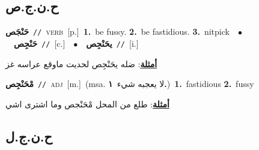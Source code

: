 \documentclass[10pt,a4paper,twoside]{article} %
\begin{document}
\begin{multicols}{2}
\vspace{-3mm}
\subsection*{\color{blue}\foreignlanguage{arabic}{ح.ن.ج.ص}\color{blue}{}} 

{\setlength\topsep{0pt}\textbf{\foreignlanguage{arabic}{حَنْجَص}}\ {\color{gray}\texttt{//}\color{black}}\ \textsc{verb}\ [p.]\ \textbf{1.}~be fussy.  \textbf{2.}~be fastidious.  \textbf{3.}~nitpick\ \ $\bullet$\ \ \setlength\topsep{0pt}\textbf{\foreignlanguage{arabic}{حَنْجِص}}\ {\color{gray}\texttt{//}\color{black}}\ [c.]\ \ $\bullet$\ \ \setlength\topsep{0pt}\textbf{\foreignlanguage{arabic}{يحَنْجِص}}\ {\color{gray}\texttt{//}\color{black}}\ [i.]\  \begin{flushright}\color{gray}\foreignlanguage{arabic}{\textbf{\underline{\foreignlanguage{arabic}{أمثلة}}}: ضله يحَنْجِص لحديت ماوقع عراسه غز}\end{flushright}\color{black}} \vspace{2mm}

{\setlength\topsep{0pt}\textbf{\foreignlanguage{arabic}{مْحَنْجِص}}\ {\color{gray}\texttt{//}\color{black}}\ \textsc{adj}\ [m.]\ \color{gray}(msa. \foreignlanguage{arabic}{لا يعجبه شيء}~\foreignlanguage{arabic}{\textbf{١.}})\color{black}\ \textbf{1.}~fastidious  \textbf{2.}~fussy\  \begin{flushright}\color{gray}\foreignlanguage{arabic}{\textbf{\underline{\foreignlanguage{arabic}{أمثلة}}}: طلع من المحل مْحَنْجص وما اشترى اشي}\end{flushright}\color{black}} \vspace{2mm}

\vspace{-3mm}
\subsection*{\color{blue}\foreignlanguage{arabic}{ح.ن.ج.ل}\color{blue}{}} 


\end{multicols}
\end{document}
